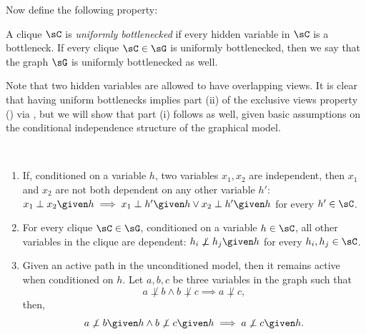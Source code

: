 Now define the following property:
\begin{property}
  \label{prop:bottleneck}
  A clique $\sC$ is \emph{uniformly bottlenecked} if
  every hidden variable in $\sC$ is a bottleneck. 
  If every clique $\sC \in \sG$ is uniformly bottlenecked, then we say
  that the graph $\sG$ is uniformly bottlenecked as well.
\end{property}
Note that two hidden variables are allowed to have overlapping views.
It is clear that having uniform bottlenecks implies part (ii)
of the exclusive views property () via \TensorFactorize,
but we will show that part (i) follows as well, given basic assumptions
on the conditional independence structure of the graphical model.

\begin{assumption}
  \label{asm:ci}  
  \
  \begin{enumerate}
    \item If, conditioned on a variable $h$, two variables $x_1, x_2$
      are independent, then $x_1$ and $x_2$ are not both dependent on
      any other variable $h'$: $x_1 \perp x_2 \given h \implies x_1
      \perp h' \given h \vee x_2 \perp h' \given h$ for every $h' \in
      \sC$.
    \item
      For every clique $\sC \in \sG$, conditioned on a variable $h \in
      \sC$, all other variables in the clique are dependent:
      $h_i \not\perp h_j \given h$ for every $h_i, h_j \in \sC$.
    \item
      Given an active path in the unconditioned model, then it remains
        active when conditioned on $h$. 
      Let $a, b, c$ be three variables in the graph such that
      $$ a \not\perp b \wedge b \not\perp c \implies a \not\perp c,$$
      then,
      $$ a \not\perp b \given h \wedge b \not\perp c \given h \implies a \not\perp c \given h.$$
  \end{enumerate}
\end{assumption}

